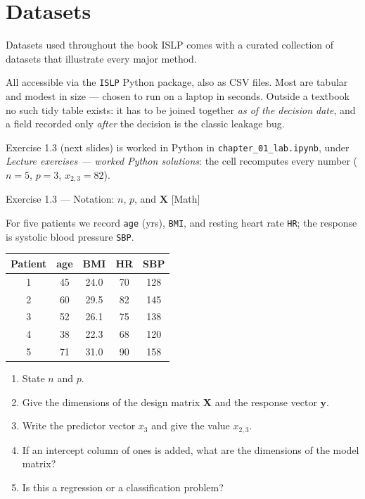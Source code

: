 \documentclass[aspectratio=169,11pt]{beamer}
\begin{document}
\section{Datasets}

\begin{frame}{Datasets used throughout the book}
  ISLP comes with a curated collection of datasets that illustrate
  every major method.
  \begin{takeaway}
    All accessible via the \texttt{ISLP} Python package, also as CSV
    files. Most are tabular and modest in size --- chosen to run on a
    laptop in seconds. Outside a textbook no such tidy table exists: it
    has to be joined together \emph{as of the decision date}, and a
    field recorded only \emph{after} the decision is the classic
    leakage bug.
  \end{takeaway}
  \begin{labnote}
    Exercise 1.3 (next slides) is worked in Python in \texttt{chapter\_01\_lab.ipynb}, under \emph{Lecture exercises --- worked Python solutions}: the cell recomputes every number ($n=5$, $p=3$, $x_{2,3}=82$).
  \end{labnote}
\end{frame}




\begin{frame}{Exercise 1.3 --- Notation: $n$, $p$, and $\mathbf{X}$ [Math]}
\begin{exercise}
For five patients we record \texttt{age} (yrs), \texttt{BMI}, and
resting heart rate \texttt{HR}; the response is systolic blood
pressure \texttt{SBP}.
\begin{center}\vspace{-2mm}\footnotesize
\begin{tabular}{cccc|c}
\toprule
Patient & age & BMI & HR & SBP \\
\midrule
1 & 45 & 24.0 & 70 & 128 \\
2 & 60 & 29.5 & 82 & 145 \\
3 & 52 & 26.1 & 75 & 138 \\
4 & 38 & 22.3 & 68 & 120 \\
5 & 71 & 31.0 & 90 & 158 \\
\bottomrule
\end{tabular}
\end{center}\vspace{-3mm}
\begin{enumerate}\setlength\itemsep{0pt}
  \item State $n$ and $p$.
  \item Give the dimensions of the design matrix $\mathbf{X}$ and the
        response vector $\mathbf{y}$.
  \item Write the predictor vector $x_3$ and give the value $x_{2,3}$.
  \item If an intercept column of ones is added, what are the
        dimensions of the model matrix?
  \item Is this a regression or a classification problem?
\end{enumerate}
\end{exercise}
\end{frame}
\end{document}

